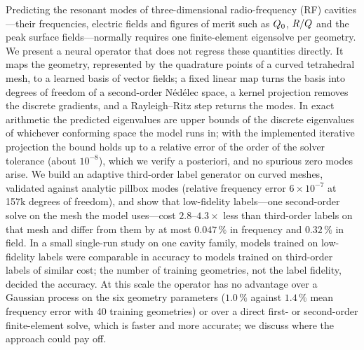 Predicting the resonant modes of three-dimensional radio-frequency (RF) cavities---their frequencies, electric
fields and figures of merit such as $\Qz$, $R/Q$ and the peak surface fields---normally requires one
finite-element eigensolve per geometry. We present a neural operator that does not regress these quantities
directly. It maps the geometry, represented by the quadrature points of a curved tetrahedral mesh, to a learned
basis of vector fields; a fixed linear map turns the basis into degrees of freedom of a second-order N\'ed\'elec
space, a kernel projection removes the discrete gradients, and a Rayleigh--Ritz step returns the modes. In exact
arithmetic the predicted eigenvalues are upper bounds of the discrete eigenvalues of whichever conforming space
the model runs in; with the implemented iterative projection the bound holds up to a relative error of the
order of the solver tolerance (about $10^{-8}$), which we verify a posteriori, and no spurious zero modes
arise. %
We build an adaptive third-order label generator on curved meshes, validated against analytic pillbox modes
(relative frequency error $6\times10^{-7}$ at 157k degrees of freedom), %
and show that low-fidelity labels---one second-order solve on the mesh the model uses---cost $2.8$--$4.3\times$
less than third-order labels on that mesh and differ from them by at most $0.047\,\%$ in frequency and
$0.32\,\%$ in field. %
In a small single-run study on one cavity family, models trained on low-fidelity labels were comparable in
accuracy to models trained on third-order labels of similar cost; the number of training geometries, not the
label fidelity, decided the accuracy. %
At this scale the operator has no advantage over a Gaussian process on the six geometry parameters
($1.0\,\%$ against $1.4\,\%$ mean frequency error with 40 training geometries) or over a direct first- or
second-order finite-element solve, which is faster and more accurate; we discuss where the approach could
pay off. %
